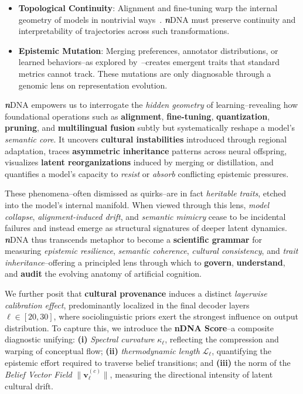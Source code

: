 \begin{tcolorbox}
\begin{itemize}
    \item[\ding{93}] \textbf{Topological Continuity}: Alignment and fine-tuning warp the internal geometry of models in nontrivial ways~\citep{chiang2023can, liu2023hidden}. \textbf{\textit{n}}{\selectfont DNA} must preserve continuity and interpretability of trajectories across such transformations.

    \item[\ding{93}] \textbf{Epistemic Mutation}: Merging preferences, annotator distributions, or learned behaviors--as explored by~\cite{bakker2024uniting}--creates emergent traits that standard metrics cannot track. These mutations are only diagnosable through a genomic lens on representation evolution.
\end{itemize}
\end{tcolorbox}

\vspace{2mm}
\textbf{\textit{n}}\textnormal{DNA} empowers us to interrogate the \emph{hidden geometry} of learning--revealing how foundational operations such as \textbf{alignment}, \textbf{fine-tuning}, \textbf{quantization}, \textbf{pruning}, and \textbf{multilingual fusion} subtly but systematically reshape a model’s \emph{semantic core}. It uncovers \textbf{cultural instabilities} introduced through regional adaptation, traces \textbf{asymmetric inheritance} patterns across neural offspring, visualizes \textbf{latent reorganizations} induced by merging or distillation, and quantifies a model’s capacity to \emph{resist} or \emph{absorb} conflicting epistemic pressures.


These phenomena--often dismissed as quirks--are in fact \emph{heritable traits}, etched into the model’s internal manifold. When viewed through this lens, \emph{model collapse}, \emph{alignment-induced drift}, and \emph{semantic mimicry} cease to be incidental failures and instead emerge as structural signatures of deeper latent dynamics. \textbf{\textit{n}}\textnormal{DNA} thus transcends metaphor to become a \textbf{scientific grammar} for measuring \emph{epistemic resilience}, \emph{semantic coherence}, \emph{cultural consistency}, and \emph{trait inheritance}--offering a principled lens through which to \textbf{govern}, \textbf{understand}, and \textbf{audit} the evolving anatomy of artificial cognition.



We further posit that \textbf{cultural provenance} induces a distinct \emph{layerwise calibration effect}, predominantly localized in the final decoder layers $\ell \in [20, 30]$, where sociolinguistic priors exert the strongest influence on output distribution. To capture this, we introduce the \textbf{nDNA Score}--a composite diagnostic unifying: \textbf{(i)} \emph{Spectral curvature} $\kappa_\ell$, reflecting the compression and warping of conceptual flow; \textbf{(ii)} \emph{thermodynamic length} $\mathcal{L}_\ell$, quantifying the epistemic effort required to traverse belief transitions; and \textbf{(iii)} the norm of the \emph{Belief Vector Field} $\|\mathbf{v}_\ell^{(c)}\|$, measuring the directional intensity of latent cultural drift.



